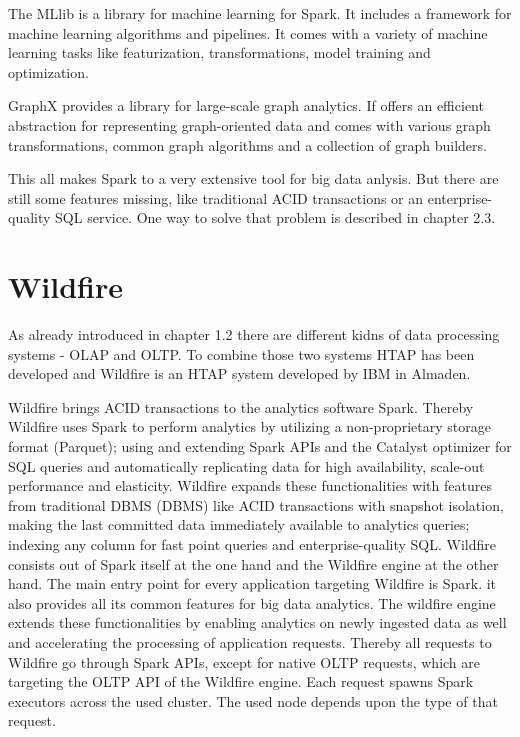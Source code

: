 The MLlib is a library for machine learning for Spark. It includes a framework for machine learning algorithms and pipelines. It comes with a variety of machine learning tasks like featurization, transformations, model training and optimization.

GraphX provides a library for large-scale graph analytics. If offers an efficient abstraction for representing graph-oriented data and comes with various graph transformations, common graph algorithms and a collection of graph builders.

This all makes Spark to a very extensive tool for big data anlysis. But there are still some features missing, like traditional ACID transactions or an enterprise-quality SQL service. One way to solve that problem is described in chapter 2.3.



\section{Wildfire}

As already introduced in chapter 1.2 there are different kidns of data processing systems - OLAP and OLTP. To combine those two systems HTAP has been developed and Wildfire is an HTAP system developed by IBM in Almaden.

Wildfire brings ACID transactions to the analytics software Spark. Thereby Wildfire uses Spark to perform analytics by utilizing a non-proprietary storage format (Parquet); using and extending Spark APIs and the Catalyst optimizer for SQL queries and automatically replicating data for high availability, scale-out performance and elasticity. Wildfire expands these functionalities with features from traditional \acs{DBMS} (\acl{DBMS}) like ACID transactions with snapshot isolation, making the last committed data immediately available to analytics queries; indexing any column for fast point queries and enterprise-quality SQL.
Wildfire consists out of Spark itself at the one hand and the Wildfire engine at the other hand. The main entry point for every application targeting Wildfire is Spark. it also provides all its common features for big data analytics. The wildfire engine extends these functionalities by enabling analytics on newly ingested data as well and accelerating the processing of application requests. Thereby all requests to Wildfire go through Spark APIs, except for native OLTP requests, which are targeting the OLTP API of the Wildfire engine. Each request spawns Spark executors across the used cluster. The used node depends upon the type of that request.

